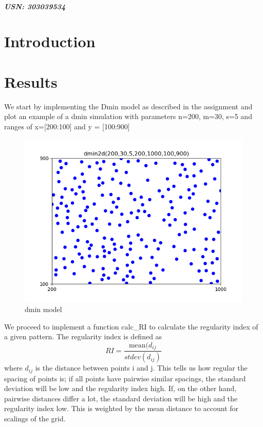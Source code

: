 \documentclass{article}
\begin{document}

\begin{center}
\textbf{\Large{}}\\
\vspace{0.8mm}
\textbf{\textit{\small{USN: 303039534}}}
\end{center}
\vspace{1.3mm}


\section{Introduction}



\section{Results}

We start by implementing the Dmin model as described in the assignment and plot an example of a dmin simulation with parameters n=200, m=30, s=5 and ranges of x=[200:100] and y = [100:900]

\begin{figure}[h]
\centering
\includegraphics[width = 0.5\linewidth, trim={0 0 0 0}, clip=true]{dmin.png}
\caption{dmin model}
\label{fig:dmin}
\end{figure}

We proceed to implement a function calc\_RI to calculate the regularity index of a given pattern. The regularity index is defined as
\begin{equation}
	RI = \dfrac{\text{mean}(d_{ij}}{stdev(d_{ij})}
\end{equation} 
where $d_{ij}$ is the distance between points i and j.
This tells us how regular the spacing of points is; if all points have pairwise similar spacings, the standard deviation will be low and the regularity index high. If, on the other hand, pairwise distances differ a lot, the standard deviation will be high and the regularity index low. This is weighted by the mean distance to account for scalings of the grid.
\end{document}
